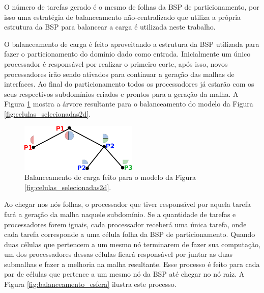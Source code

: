 O número de tarefas gerado é o mesmo de folhas da BSP de particionamento, por isso uma estratégia de balanceamento não-centralizado que utiliza a própria estrutura da BSP para balancear a carga é utilizada neste trabalho.

O balanceamento de carga é feito aproveitando a estrutura da BSP utilizada para fazer o particionamento do domínio dado como entrada. Inicialmente um único processador é responsável por realizar o primeiro corte, após isso, novos processadores irão sendo ativados para continuar a geração das malhas de interfaces. Ao final do particionamento todos os processadores já estarão com os seus respectivos subdomínios criados e prontos para a geração da malha. A Figura \ref{fig:arvore_balanceamento} mostra a árvore resultante para o balanceamento do modelo da Figura \ref{fig:celulas_selecionadas2d}.


\begin{figure}[!ht]
	\centering
	\includegraphics[width=0.5\textwidth]{fig/arvore_balanceamento.png}
	\caption{Balanceamento de carga feito para o modelo da Figura \ref{fig:celulas_selecionadas2d}.}
	\label{fig:arvore_balanceamento}
\end{figure}


Ao chegar nos nós folhas, o processador que tiver responsável por aquela tarefa fará a geração da malha naquele subdomínio. Se a quantidade de tarefas e processadores forem iguais, cada processador receberá uma única tarefa, onde cada tarefa corresponde a uma célula folha da BSP de particionamento. Quando duas células que pertencem a um mesmo nó terminarem de fazer sua computação, um dos processadores dessas células ficará responsável por juntar as duas submalhas e fazer a melhoria na malha resultante. Esse processo é feito para cada par de células que pertence a um mesmo nó da BSP até chegar no nó raiz. A Figura \ref{fig:balanceamento_esfera} ilustra este processo.


